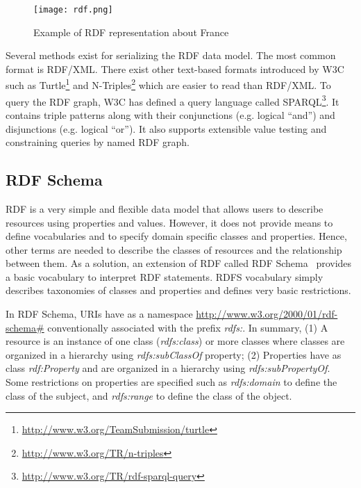  \begin{figure}[htbp]
   \centering
  \texttt{[image: rdf.png]}
  \caption{Example of RDF representation about France}
  \label{fig:rdffrance}
  \end{figure} 

Several methods exist for serializing the RDF data model. The most common format is RDF/XML. There exist other text-based formats introduced by W3C such as Turtle\footnote{\url{http://www.w3.org/TeamSubmission/turtle}} and N-Triples\footnote{\url{http://www.w3.org/TR/n-triples}} which are easier to read than RDF/XML. To query the RDF graph, W3C has defined a query language called SPARQL\footnote{\url{http://www.w3.org/TR/rdf-sparql-query}}. It contains triple patterns along with their conjunctions (e.g. logical ``and'') and disjunctions (e.g. logical ``or''). It also supports extensible value testing and constraining queries by named RDF graph.

\subsection{RDF Schema}

RDF is a very simple and flexible data model that allows users to describe resources using properties and values. However, it does not provide means to define vocabularies and to specify domain specific classes and properties. Hence, other terms are needed to describe the classes of resources and the relationship between them. As a solution, an extension of RDF called RDF Schema~\cite{Brickley:2014} provides a basic vocabulary to interpret RDF statements. RDFS vocabulary simply describes taxonomies of classes and properties and defines very basic restrictions.

In RDF Schema, URIs have as a namespace \url{http://www.w3.org/2000/01/rdf-schema#}      
conventionally associated with the prefix \emph{rdfs:}. In summary, (1) A resource is an instance of one class (\emph{rdfs:class}) or more classes where classes are organized in a hierarchy using \emph{rdfs:subClassOf} property; (2) Properties have as class \emph{rdf:Property} and are organized in a hierarchy using \emph{rdfs:subPropertyOf}. Some restrictions on properties are specified such as \emph{rdfs:domain} to define the class of the subject, and \emph{rdfs:range} to define the class of the object. 

